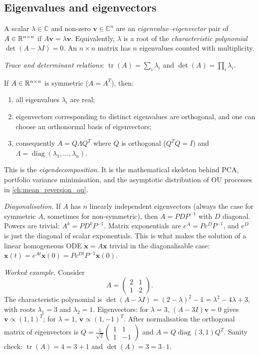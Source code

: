 \subsection{Eigenvalues and eigenvectors}

A scalar $\lambda \in \mathbb{C}$ and non-zero $\bm{v} \in \mathbb{C}^n$
are an \emph{eigenvalue}--\emph{eigenvector} pair of $A \in \mathbb{R}^{n\times n}$
if $A \bm{v} = \lambda \bm{v}$. Equivalently, $\lambda$ is a root of the
\emph{characteristic polynomial} $\det(A - \lambda I) = 0$. An
$n\times n$ matrix has $n$ eigenvalues counted with multiplicity.

\emph{Trace and determinant relations}: $\operatorname{tr}(A) = \sum_i \lambda_i$
and $\det(A) = \prod_i \lambda_i$.

\begin{keyfactbox}
If $A \in \mathbb{R}^{n\times n}$ is symmetric ($A = A^T$), then:
\begin{enumerate}
  \item all eigenvalues $\lambda_i$ are real;
  \item eigenvectors corresponding to distinct eigenvalues are
        orthogonal, and one can choose an orthonormal basis of
        eigenvectors;
  \item consequently $A = Q \Lambda Q^T$ where $Q$ is orthogonal
        ($Q^T Q = I$) and $\Lambda = \operatorname{diag}(\lambda_1,\dots,\lambda_n)$.
\end{enumerate}
This is the \emph{eigendecomposition}. It is the mathematical skeleton
behind PCA, portfolio variance minimisation, and the asymptotic
distribution of OU processes in \cref{ch:mean_reversion_ou}.
\end{keyfactbox}

\emph{Diagonalisation.} If $A$ has $n$ linearly independent
eigenvectors (always the case for symmetric $A$, sometimes for
non-symmetric), then $A = P D P^{-1}$ with $D$ diagonal. Powers are
trivial: $A^k = P D^k P^{-1}$. Matrix exponentials are
$e^A = P e^D P^{-1}$, and $e^D$ is just the diagonal of scalar
exponentials. This is what makes the solution of a linear
homogeneous ODE $\dot {\bm x} = A \bm x$ trivial in the
diagonalisable case: $\bm x(t) = e^{At} \bm x(0) = P e^{Dt} P^{-1}
\bm x(0)$.

\emph{Worked example.} Consider
\[
A = \begin{pmatrix} 2 & 1 \\ 1 & 2 \end{pmatrix}.
\]
The characteristic polynomial is
$\det(A - \lambda I) = (2-\lambda)^2 - 1 = \lambda^2 - 4\lambda + 3$,
with roots $\lambda_1 = 3$ and $\lambda_2 = 1$. Eigenvectors:
for $\lambda = 3$, $(A - 3I)\bm{v} = 0$ gives $\bm{v} \propto (1,1)^T$;
for $\lambda = 1$, $\bm{v} \propto (1,-1)^T$. After normalisation the
orthogonal matrix of eigenvectors is $Q = \tfrac{1}{\sqrt{2}}\begin{pmatrix}
1 & 1 \\ 1 & -1 \end{pmatrix}$ and $A = Q \operatorname{diag}(3,1) Q^T$.
Sanity check: $\operatorname{tr}(A) = 4 = 3 + 1$ and $\det(A) = 3 =
3 \cdot 1$.

